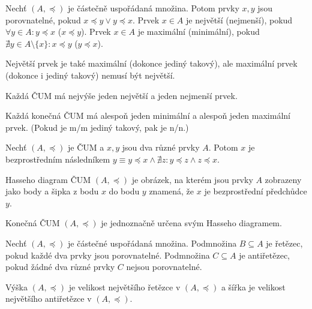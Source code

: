 \documentclass[12pt]{article}					%
\begin{document}
    \begin{definice}
        Nechť $(A, \preceq)$ je částečně uspořádaná množina. Potom prvky $x, y$ jsou porovnatelné, pokud $x \preceq y \lor y \preceq x$. Prvek $x \in A$ je největší (nejmenší), pokud $\forall y \in A: y \preceq x$ ($x \preceq y$). Prvek $x \in A$ je maximální (minimální), pokud $\nexists y \in A \setminus \{x\}: x \preceq y$ ($y \preceq x$).
    \end{definice}

    \begin{poznamka}[Pozorovani]
        Největší prvek je také maximální (dokonce jediný takový), ale maximální prvek (dokonce i jediný takový) nemusí být největší.

        Každá ČUM má nejvýše jeden největší a jeden nejmenší prvek.

        Každá konečná ČUM má alespoň jeden minimální a alespoň jeden maximální prvek. (Pokud je m/m jediný takový, pak je n/n.)
    \end{poznamka}

    \begin{definice}
        Nechť $(A, \preceq)$ je ČUM a $x, y$ jsou dva různé prvky $A$. Potom $x$ je bezprostředním následníkem $y ≡ y\preceq x \land \nexists z: y \preceq z \land z \preceq x$.
    \end{definice}

    \begin{definice}
        Hasseho diagram ČUM $(A, \preceq)$ je obrázek, na kterém jsou prvky $A$ zobrazeny jako body a šipka z bodu $x$ do bodu $y$ znamená, že $x$ je bezprostřední předchůdce $y$.
    \end{definice}

    \begin{poznamka}[Pozorování]
        Konečná ČUM $(A, \preceq)$ je jednoznačně určena svým Hasseho diagramem.
    \end{poznamka}

    \begin{definice}
        Nechť $(A, \preceq)$ je částečné uspořádaná množina. Podmnožina $B \subseteq A$ je řetězec, pokud každé dva prvky jsou porovnatelné. Podmnožina $C \subseteq A$ je antiřetězec, pokud žádné dva různé prvky $C$ nejsou porovnatelné.

        Výška $(A, \preceq)$ je velikost největšího řetězce v $(A, \preceq)$ a šířka je velikost největšího antiřetězce v $(A, \preceq)$.
    \end{definice}
\end{document}
